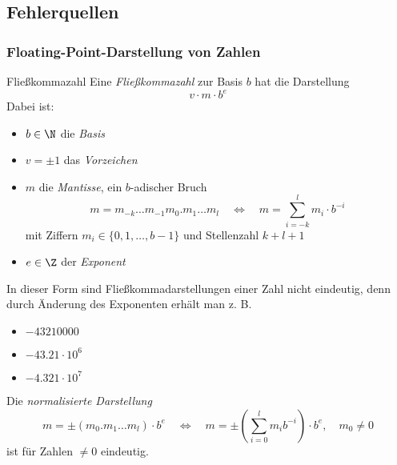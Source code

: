 \subsection{Fehlerquellen}

\subsubsection{Floating-Point-Darstellung von Zahlen}

\begin{defi}{Fließkommazahl}
    Eine \emph{Fließkommazahl} zur Basis $b$ hat die Darstellung
    \[
        v \cdot m \cdot b^e
    \]
    Dabei ist:
    \begin{itemize}
        \item $b \in \N$ die \emph{Basis}
        \item $v = \pm 1$ das \emph{Vorzeichen}
        \item $m$ die \emph{Mantisse}, ein $b$-adischer Bruch
              \[
                  m = m_{-k} \ldots m_{-1}m_0 . m_1 \ldots m_l \quad \iff \quad m = \sum_{i = -k}^{l} m_i \cdot b^{-i}
              \]
              mit Ziffern $m_i \in \{ 0, 1, \ldots, b-1 \}$ und Stellenzahl $k + l + 1$
        \item $e \in \Z$ der \emph{Exponent}
    \end{itemize}

    In dieser Form sind Fließkommadarstellungen einer Zahl nicht eindeutig, denn durch Änderung des Exponenten erhält man z. B.
    \begin{itemize}
        \item $\num{-43210000}$
        \item $-43.21 \cdot 10^6$
        \item $-4.321 \cdot 10^7$
    \end{itemize}

    Die \emph{normalisierte Darstellung}
    \[
        m = \pm (m_0 . m_1 \ldots m_l) \cdot b^e \quad \iff \quad m = \pm \left( \sum_{i = 0}^{l} m_i b^{-i} \right) \cdot b^e, \quad m_0 \neq 0
    \]
    ist für Zahlen $\neq 0$ eindeutig.
\end{defi}

